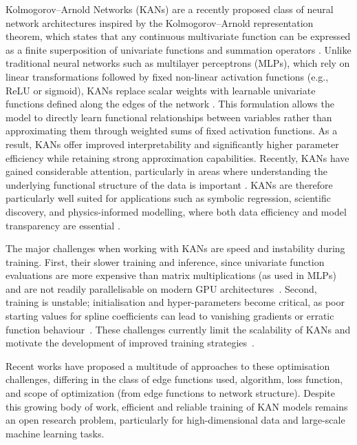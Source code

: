 \documentclass{article}
\begin{document}
Kolmogorov--Arnold Networks (KANs) are a recently proposed class of neural network architectures inspired by the Kolmogorov--Arnold representation theorem, which states that any continuous multivariate function can be expressed as a finite superposition of univariate functions and summation operators \cite{kolmogorov1956representation, arnold1963representation}. 
Unlike traditional neural networks such as multilayer perceptrons (MLPs), which rely on linear transformations followed by fixed non-linear activation functions (e.g., ReLU or sigmoid), KANs replace scalar weights with learnable univariate functions defined along the edges of the network \cite{liu2024kan}. 
This formulation allows the model to directly learn functional relationships between variables rather than approximating them through weighted sums of fixed activation functions. 
As a result, KANs offer improved interpretability and significantly higher parameter efficiency while retaining strong approximation capabilities. 
Recently, KANs have gained considerable attention, particularly in areas where understanding the underlying functional structure of the data is important \cite{somvanshi2025survey,essahraui2025kanoverview,sohail2024training}. 
KANs are therefore particularly well suited for applications such as symbolic regression, scientific discovery, and physics-informed modelling, where both data efficiency and model transparency are essential \cite{somvanshi2025survey, essahraui2025kanoverview}. 

The major challenges when working with KANs are speed and instability during training.
First, their slower training and inference, since univariate function evaluations are more expensive than matrix multiplications (as used in MLPs) and are not readily parallelisable on modern GPU architectures~\cite{liu2024kan,somvanshi2025survey,essahraui2025kanoverview}. 
Second, training is unstable; initialisation and hyper-parameters become critical, as poor starting values for spline coefficients can lead to vanishing gradients or erratic function behaviour~\cite{tan2019vanishing}.
These challenges currently limit the scalability of KANs and motivate the development of improved training strategies~\cite{sohail2024training}.

Recent works have proposed a multitude of approaches to these optimisation challenges, differing in the class of edge functions used, algorithm, loss function, and scope of optimization (from edge functions to network structure).
Despite this growing body of work, efficient and reliable training of KAN models remains an open research problem, particularly for high-dimensional data and large-scale machine learning tasks.
\end{document}
